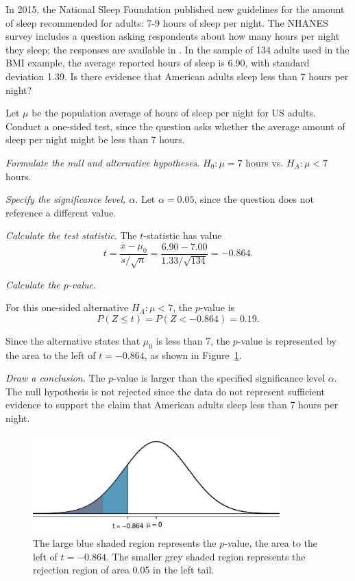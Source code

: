 \begin{examplewrap}
\begin{nexample}{In 2015, the National Sleep Foundation published new guidelines for the amount of sleep recommended for adults: 7-9 hours of sleep per night.\footnotemark{} The NHANES survey includes a question asking respondents about how many hours per night they sleep; the responses are available in . In the sample of 134 adults used in the BMI example, the average reported hours of sleep is 6.90, with standard deviation 1.39. Is there evidence that American adults sleep less than 7 hours per night?}

Let $\mu$ be the population average of hours of sleep per night for US adults. Conduct a one-sided test, since the question asks whether the average amount of sleep per night might be less than 7 hours. 

\textit{Formulate the null and alternative hypotheses}. $H_0: \mu = 7$ hours vs. $H_A: \mu < 7$ hours.

\textit{Specify the significance level, $\alpha$}.  Let $\alpha = 0.05$, since the question does not reference a different value. 

\textit{Calculate the test statistic}. The $t$-statistic has value
\[t = \frac{\overline{x}-\mu_0}{s/\sqrt{n}} = \frac{6.90 - 7.00} {1.33/\sqrt{134}} = -0.864.\]

\textit{Calculate the $p$-value}.

For this one-sided alternative $H_A: \mu < 7$, the $p$-value is
\[P(Z \leq t) = P(Z < -0.864) = 0.19.\]

Since the alternative states that $\mu_0$ is less than 7, the $p$-value is represented by the area to the left of $t = -0.864$, as shown in Figure~\ref{pValueSleep}.

\textit{Draw a conclusion}.  The $p$-value is larger than the specified significance level $\alpha$. The null hypothesis is not rejected since the data do not represent sufficient evidence to support the claim that American adults sleep less than 7 hours per night.
\end{nexample}
\end{examplewrap}

\textD{\newpage}

\begin{figure}[h]
	\centering
	\includegraphics[width=0.85\textwidth]{ch_inference_foundations_oi_biostat/figures/pValueSleep/pValueSleep}
	\caption{The large blue shaded region represents the $p$-value, the area to the left of $t = -0.864$. The smaller grey shaded region represents the rejection region of area 0.05 in the left tail.}
	\label{pValueSleep}
\end{figure}

